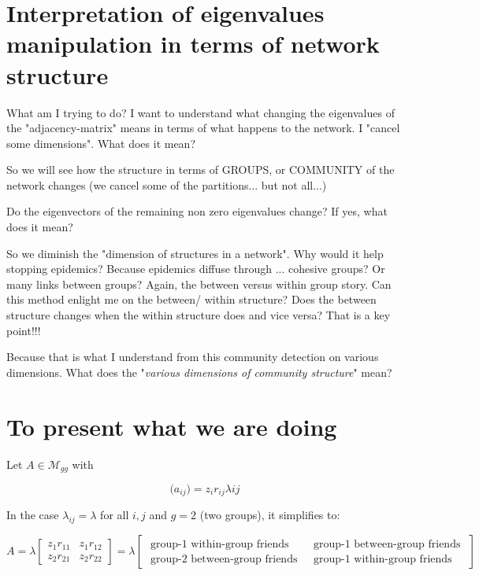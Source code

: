 \documentclass[12pt]{article}
\begin{document}
\section{Interpretation of eigenvalues manipulation in terms of network structure}

{ \scriptsize { \color{Orchid} What am I trying to do? I want to understand what changing the eigenvalues of the "adjacency-matrix" means in terms of what happens to the network. I "cancel some dimensions". What does it mean?

So we will see how the structure in terms of GROUPS, or COMMUNITY of the network changes (we cancel some of the partitions... but not all...)

Do the eigenvectors of the remaining non zero eigenvalues change? If yes, what does it mean?

So we diminish the "dimension of structures in a network". Why would it help stopping epidemics? Because epidemics diffuse through ... cohesive groups? Or many links between groups? Again, the between versus within group story. Can this method enlight me on the between/ within structure? Does the between structure changes when the within structure does and vice versa? That is a key point!!! 

Because that is what I understand from this community detection on various dimensions. What does the "\textit{various dimensions of community structure}" mean?   \par } }

\section{To present what we are doing}
\newpage

Let $A \in \mathcal{M}_{gg}$ with 

\[\big(  a_{ij} \big) = z_i r_{ij} \lambda{ij} \]

In the case $\lambda_{ij}=\lambda$ for all $i,j$ and $g=2$ (two groups), it simplifies to:

\[ A = \lambda \begin{bmatrix} z_1 r_{11} & z_1 r_{12} \\ z_2 r_{21} & z_2 r_{22}  \end{bmatrix} = \lambda
 \begin{bmatrix} \text{ group-$1$ within-group friends } & \text{ group-$1$ between-group friends } \\
\text{ group-$2$ between-group friends } & \text{ group-$1$ within-group friends }  \end{bmatrix}  \]
\end{document}
